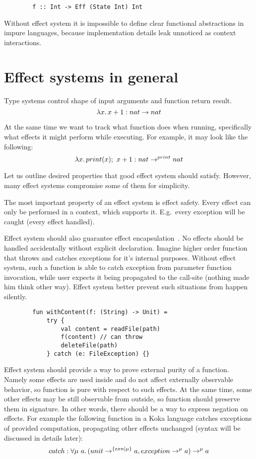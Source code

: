 \documentclass[conference]{IEEEtran}
\newcommand{\seq}{;~}
\newcommand{\ap}{~}
\begin{document}
    \begin{verbatim}
        f :: Int -> Eff (State Int) Int
    \end{verbatim}

    Without effect system it is impossible to define clear functional abstractions in impure languages, because implementation details leak unnoticed as context interactions.

    \section{Effect systems in general}

    Type systems control shape of input arguments and function return result.
    \[\lambda x\ldotp x + 1 : nat\to nat\]

    At the same time we want to track what function does when running, specifically what effects it might perform while executing.
    For example, it may look like the following:
    \[\lambda x\ldotp print(x)\seq x + 1 : nat\to^{print} nat\]

    Let us outline desired properties that good effect system should satisfy.
    However, many effect systems compromise some of them for simplicity.

    The most important property of an effect system is effect safety.
    Every effect can only be performed in a context, which supports it.
    E.g.\ every exception will be caught (every effect handled).

    Effect system should also guarantee effect encapsulation~\cite{encapsulation}.
    No effects should be handled accidentally without explicit declaration.
    Imagine higher order function that throws and catches exceptions for it's internal purposes.
    Without effect system, such a function is able to catch exception from parameter function invocation, while user expects it being propagated to the call-site (nothing made him think other way).
    Effect system better prevent such situations from happen silently.
    \begin{verbatim}
        fun withContent(f: (String) -> Unit) =
            try {
                val content = readFile(path)
                f(content) // can throw
                deleteFile(path)
            } catch (e: FileException) {}
    \end{verbatim}

    Effect system should provide a way to prove external purity of a function.
    Namely some effects are used inside and do not affect externally observable behavior, so function is pure with respect to such effects.
    At the same time, some other effects may be still observable from outside, so function should preserve them in signature.
    In other words, there should be a way to express negation on effects.
    For example the following function in a Koka language catches exceptions of provided computation, propagating other effects unchanged (syntax will be discussed in details later):
    \[catch : \forall \mu\ap a\ldotp (unit\to^{\{exn|\mu\}} a, exception \to^{\mu} a) \to^\mu a\]
\end{document}
